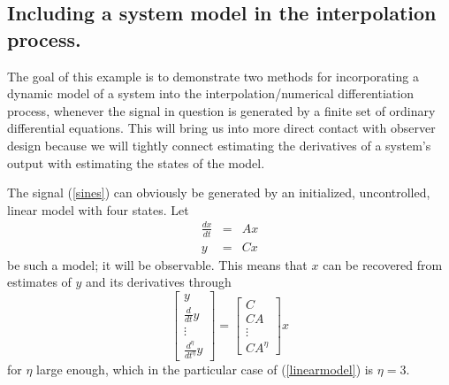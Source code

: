 \subsection{Including a system model in the interpolation process.}

The goal of this example is to demonstrate two methods for incorporating
a dynamic model of a system into the interpolation/numerical differentiation
process,
whenever the signal in question is generated by a finite set of ordinary
differential equations.
This will bring us into more direct contact with observer design because we
will tightly connect estimating the derivatives of a system's output
with estimating the states of the model.

The signal (\ref{sines}) can obviously be generated by an initialized,
uncontrolled, linear model with four states.  Let 
\begin{equation}
\begin{array}{rcl}
\frac{dx}{dt} & = &  A x  \\
y & = & C x 
\end{array}
\label{linearmodel}
\end{equation}
be such a model; it will be observable.  This means that $x$ can be recovered
from estimates of $y$ and its derivatives through
\begin{equation} \left[ \begin{array}{r} 
y \\ \frac{d}{dt}y \\ \vdots \\ \frac{d^{\eta}}{dt^{\eta}}y
\end{array} \right] = \left[ \begin{array}{l} 
C \\ CA \\ \vdots \\ CA^{\eta}
\end{array} \right] x
\label{obsmat}
\end{equation}
for $\eta$ large enough, which in the particular case of (\ref{linearmodel}) is
$\eta = 3$.

